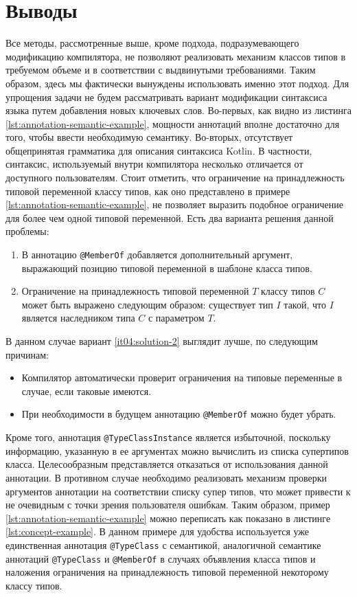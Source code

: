 \section{Выводы}

Все методы, рассмотренные выше, кроме подхода, подразумевающего модификацию компилятора, не позволяют реализовать механизм классов типов в требуемом объеме и в соответствии с выдвинутыми требованиями. Таким образом, здесь мы фактически вынуждены использовать именно этот подход. Для упрощения задачи не будем рассматривать вариант модификации синтаксиса языка путем добавления новых ключевых слов. Во-первых, как видно из листинга \ref{lst:annotation-semantic-example}, мощности аннотаций вполне достаточно для того, чтобы ввести необходимую семантику. Во-вторых, отсутствует общепринятая грамматика для описания синтаксиса Kotlin. В частности, синтаксис, используемый внутри компилятора несколько отличается от доступного пользователям. Стоит отметить, что ограничение на принадлежность типовой переменной классу типов, как оно представлено в примере \ref{lst:annotation-semantic-example}, не позволяет выразить подобное ограничение для более чем одной типовой переменной. Есть два варианта решения данной проблемы:
\begin{enumerate}
    \item \label{it04:solution-1} В аннотацию \lstinline{@MemberOf} добавляется дополнительный аргумент, выражающий позицию типовой переменной в шаблоне класса типов. 
    \item \label{it04:solution-2} Ограничение на принадлежность типовой переменной $T$ классу типов $C$ может быть выражено следующим образом: существует тип $I$ такой, что $I$ является наследником типа $C$ с параметром $T$.
\end{enumerate}
В данном случае вариант \ref{it04:solution-2} выглядит лучше, по следующим причинам:
\begin{itemize}
    \item Компилятор автоматически проверит ограничения на типовые переменные в случае, если таковые имеются.
    \item При необходимости в будущем аннотацию \lstinline{@MemberOf} можно будет убрать.
\end{itemize}
Кроме того, аннотация \lstinline{@TypeClassInstance} является избыточной, поскольку информацию, указанную в ее аргументах можно вычислить из списка супертипов класса. Целесообразным представляется отказаться от использования данной аннотации. В противном случае необходимо реализовать механизм проверки аргументов аннотации на соответствии списку супер типов, что может привести к не очевидным с точки зрения пользователя ошибкам. Таким образом, пример \ref{lst:annotation-semantic-example} можно переписать как показано в листинге \ref{lst:concept-example}. В данном примере для удобства используется уже единственная аннотация \lstinline{@TypeClass} с семантикой, аналогичной семантике аннотаций \lstinline{@TypeClass} и \lstinline{@MemberOf} в случаях объявления класса типов и наложения ограничения на принадлежность типовой переменной некоторому классу типов. 

